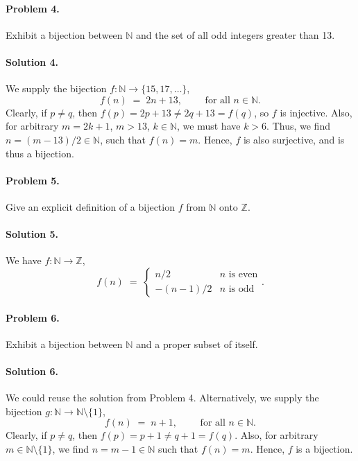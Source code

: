 \documentclass[10pt]{article}
\begin{document}
        \paragraph{Problem 4.} Exhibit a bijection between $\mathbb{N}$ and the set of all odd integers greater than 13.
        \paragraph{Solution 4.} We supply the bijection $f\colon \mathbb{N} \to \{15, 17, \dots\}$,
        \[
                f(n) \;=\; 2n + 13, \quad\quad\text{ for all }n \in \mathbb{N}.
        \]
        Clearly, if $p \neq q$, then $f(p) = 2p + 13 \neq 2q + 13 = f(q)$, so $f$ is injective.
        Also, for arbitrary $m = 2k + 1$, $m > 13$, $k \in \mathbb{N}$, we must have $k > 6$. Thus, we find $n = (m - 13) / 2 \in \mathbb{N}$,
        such that $f(n) = m$. Hence, $f$ is also surjective, and is thus a bijection.

        \paragraph{Problem 5.} Give an explicit definition of a bijection $f$ from $\mathbb{N}$ onto $\mathbb{Z}$.
        \paragraph{Solution 5.} We have $f\colon \mathbb{N} \to \mathbb{Z}$,
        \[
                f(n) \;=\; \begin{cases}
                        n/2     &       n \text{ is even}\\
                        -(n - 1)/2 &    n \text{ is odd}
                \end{cases}.
        \]
        
        \paragraph{Problem 6.} Exhibit a bijection between $\mathbb{N}$ and a proper subset of itself.
        \paragraph{Solution 6.} We could reuse the solution from Problem 4. Alternatively, we supply the bijection $g\colon \mathbb{N} \to \mathbb{N}
        \setminus\{1\}$,
        \[
                f(n) \;=\; n + 1, \quad\quad\text{ for all }n \in \mathbb{N}.
        \]
        Clearly, if $p \neq q$, then $f(p) = p + 1 \neq q + 1 = f(q)$. Also, for arbitrary $m \in \mathbb{N}\setminus\{1\}$, we find
        $n = m - 1 \in \mathbb{N}$ such that $f(n) = m$. Hence, $f$ is a bijection.
\end{document}
